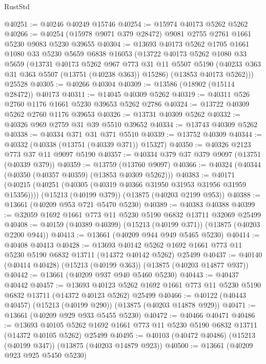 \begin{lexlean}{RustStd}
\begin{coremodule}
@40251 := @40246 @40249 @15746
@40254 := @15974 @40173 @5262 @5262
@40266 := @40254 (@15978 @9071 @379 @28472) @9081 @2755 @2761 @1661 @5230 @9083 @5230 @39655
@40304 := @13693
    @40173
    @5262
    @1705
    @1661
    @1080
    @33
    @5230
    @5659
    @6838
    @16053
    (@13722
      @40173
      @5262
      @1080
      @33
      @5659
      (@13731
        @40173
        @5262
        @967
        @773
        @31
        @11
        @5507
        @5190
        (@40233 @363 @31 @363 @5507 (@13751 (@40238 @363)) @15286)
        (@13853 @40173 @5262)))
    @25528
@40305 := @40266 @40304
@40309 := @13586 (@18902 (@15114 @28472)) @40173
@40311 := @14045 @40309 @5262
@40319 := @40311 @526 @2760 @1176 @1661 @5230 @39653 @5262 @2786
@40324 := @13722 @40309 @5262 @2760 @1176 @39653
@40326 := @13731 @40309 @5262
@40332 := @40326 @969 @2759 @31 @39 @5510 @39652
@40334 := @13743 @40309 @5262
@40338 := @40334 @371 @31 @371 @5510
@40339 := @13752 @40309
@40344 := @40332 (@40338 (@13751 (@40339 @371)) @15327)
@40350 := @40326 @2123 @773 @37 @11 @9097 @5190
@40357 := @40334 @379 @37 @379 @9097 (@13751 (@40339 @379))
@40359 := @13759 (@13760 @9097)
@40366 := @40324 (@40344 (@40350 (@40357 @40359) (@13853 @40309 @5262)))
@40383 := @40171
    (@40215 (@40251 (@40305 (@40319 @40366 @31950 @31953 @31956 @31959 @15356))))
    (@15213 (@40199 @379))
    (@13875 (@40203 @2199 @953))
@40388 := @13661 (@40209 @953 @721 @5470 @5230)
@40389 := @40383 @40388
@40399 := @32059 @1692 @1661 @773 @11 @5230 @5190 @6832 @13711 @32069 @25499
@40408 := @40159 (@40389 @40399) (@15213 (@40199 @371)) (@13875 (@40203 @2200 @944))
@40413 := @13661 (@40209 @944 @949 @5465 @5230)
@40414 := @40408 @40413
@40428 := @13693
    @40142
    @5262
    @1692
    @1661
    @773
    @11
    @5230
    @5190
    @6832
    @13711
    (@14372 @40142 @5262)
    @25499
@40437 := @40140 (@40414 @40428) (@15213 (@40199 @363)) (@13875 (@40203 @14877 @937))
@40442 := @13661 (@40209 @937 @940 @5460 @5230)
@40443 := @40437 @40442
@40457 := @13693
    @40123
    @5262
    @1692
    @1661
    @773
    @11
    @5230
    @5190
    @6832
    @13711
    (@14372 @40123 @5262)
    @25499
@40466 := @40122 (@40443 @40457) (@15213 (@40199 @290)) (@13875 (@40203 @14878 @929))
@40471 := @13661 (@40209 @929 @933 @5455 @5230)
@40472 := @40466 @40471
@40486 := @13693
    @40105
    @5262
    @1692
    @1661
    @773
    @11
    @5230
    @5190
    @6832
    @13711
    (@14372 @40105 @5262)
    @25499
@40495 := @40103 (@40472 @40486) (@15213 (@40199 @347)) (@13875 (@40203 @14879 @923))
@40500 := @13661 (@40209 @923 @925 @5450 @5230)

\end{coremodule}
\end{lexlean}
